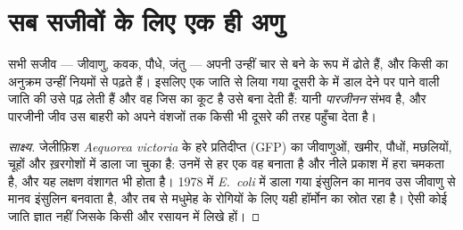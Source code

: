 \section{सब सजीवों के लिए एक ही अणु}

\begin{proposition}[DNA की सार्वत्रिकता]\label{prop:g10:universal-dna:universal}
सभी सजीव --- जीवाणु, कवक, पौधे, जंतु --- अपनी  उन्हीं चार
 से बने  के रूप में ढोते हैं, और किसी  का अनुक्रम
उन्हीं नियमों से पढ़ते हैं। इसलिए एक जाति से लिया गया  दूसरी के 
में डाल देने पर पाने वाली जाति की  उसे पढ़ लेती हैं और वह जिस
 का कूट है उसे बना देती हैं: यानी
\emph{पारजीनन} संभव है, और पारजीनी जीव उस बाहरी  को
अपने वंशजों तक किसी भी दूसरे  की तरह पहुँचा देता है।
\end{proposition}
\begin{proof}[साक्ष्य]
जेलीफ़िश \emph{Aequorea victoria} के हरे प्रतिदीप्त  (GFP) का 
जीवाणुओं, खमीर, पौधों, मछलियों, चूहों और ख़रगोशों में डाला जा चुका है:
उनमें से हर एक वह  बनाता है और नीले प्रकाश में हरा चमकता है, और
यह लक्षण वंशागत भी होता है। 1978 में \emph{E.~coli} में डाला गया इंसुलिन
का मानव  उस जीवाणु से मानव इंसुलिन बनवाता है, और तब से मधुमेह के
रोगियों के लिए यही हॉर्मोन का स्रोत रहा है। ऐसी कोई जाति ज्ञात नहीं
जिसके  किसी और रसायन में लिखे हों।
\end{proof}

